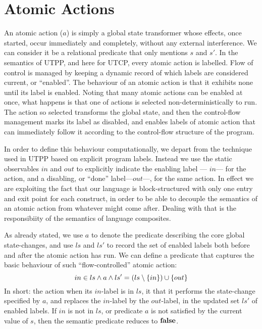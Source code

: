 \section{Atomic Actions}\label{sec:atomic}

An atomic action ($a$) is simply a global state transformer whose effects,
once started,
occur immediately and completely, without any external interference.
We can consider it be a relational predicate that only mentions $s$ and $s'$.
In the semantics of UTPP, and here for UTCP,
every atomic action is labelled.
Flow of control is managed by keeping a dynamic record
of which labels are considered current, or ``enabled''.
The behaviour of an atomic action is that it exhibits none
until its label is enabled.
Noting that many atomic actions can be enabled at once,
what happens is that one of actions is selected non-deterministically to run.
The action so selected transforms the global state,
and then the control-flow management marks its label as disabled,
and enables labels of atomic action that can immediately follow it
according to the control-flow structure of the program.

In order to define this behaviour computationally,
we depart from the technique used in UTPP based on explicit program labels.
Instead we use the static observables $in$ and $out$ to explicitly indicate
the enabling label --- $in$--- for the action,
and a disabling, or ``done'' label---$out$---, for the same action.
In effect we are exploiting the fact that our language is block-structured
with only one entry and exit point for each construct,
in order to be able to decouple the semantics of an atomic action
from whatever might come after.
Dealing with that is the responsibiity of the semantics of language composites.

As already stated,
we use $a$ to denote the predicate describing the core global state-changes,
and  use $ls$ and $ls'$ to record the set of enabled labels both before
and after the atomic action has run.
We can define a predicate that captures the basic behaviour
of such ``flow-controlled'' atomic action:
\begin{equation}
  in \in ls
  \land
  a
  \land
  ls'=(ls\setminus\{{in}\})\cup\{{out}\}
  \label{pred:flow-atomic-action}
\end{equation}
In short: the action when its $in$-label is in $ls$,
it that it performs the state-change specified by $a$,
and replaces the $in$-label by the $out$-label,
in the updated set $ls'$ of enabled labels.
If $in$ is not in $ls$,
or predicate $a$ is not satisfied by the current value of $s$,
then the semantic predicate reduces to $\mathbf{false}$.


